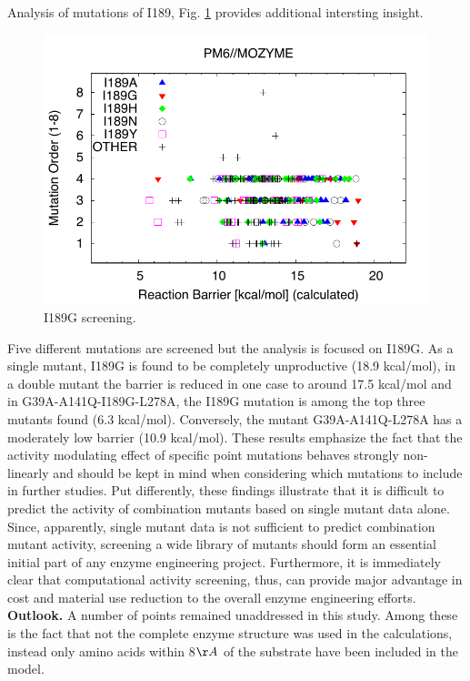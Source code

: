 Analysis of mutations of I189, Fig. \ref{fig:i189g} provides additional intersting insight.
\begin{figure}[htbp] 
\includegraphics[width=0.95\linewidth]{011-diag_eval_scre_setL-i189.pdf}
\caption{
I189G screening.
}
\label{fig:i189g}
\end{figure}
Five different mutations are screened but the analysis is focused on I189G.
As a single mutant, I189G is found to be completely unproductive (18.9 kcal/mol), in a double mutant the barrier is reduced in one case to around 17.5 kcal/mol and in G39A-A141Q-I189G-L278A, the I189G mutation is among the top three mutants found (6.3 kcal/mol).
Conversely, the mutant G39A-A141Q-L278A has a moderately low barrier (10.9 kcal/mol).
These results emphasize the fact that the activity modulating effect of specific point mutations behaves strongly non-linearly and should be kept in mind when considering which mutations to include in further studies.
Put differently, these findings illustrate that it is difficult to predict the activity of combination mutants based on single mutant data alone.
Since, apparently, single mutant data is not sufficient to predict combination mutant activity, screening a wide library of mutants should form an essential initial part of any enzyme engineering project.
Furthermore, it is immediately clear that computational activity screening, thus, can provide major advantage in cost and material use reduction to the overall enzyme engineering efforts.\\
\textbf{Outlook.} A number of points remained unaddressed in this study.
Among these is the fact that not the complete enzyme structure was used in the calculations, instead only amino acids within 8$\AA$ of the substrate have been included in the model.
